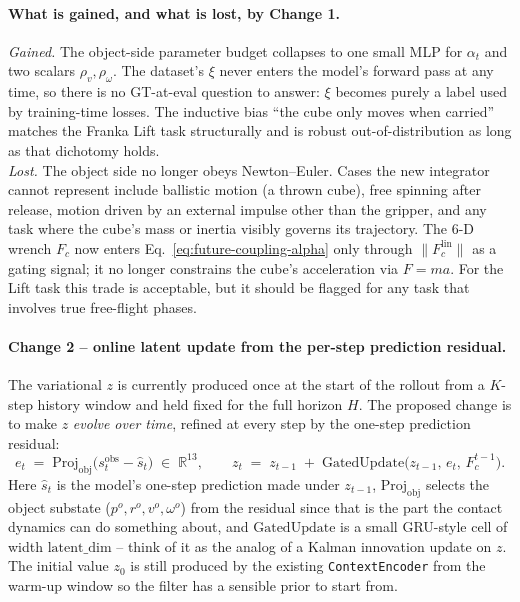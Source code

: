 \documentclass[11pt]{article}
\begin{document}
\paragraph{What is gained, and what is lost, by Change 1.}
\emph{Gained.} The object-side parameter budget collapses to one small
MLP for $\alpha_t$ and two scalars $\rho_v,\rho_\omega$. The dataset's
$\xi$ never enters the model's forward pass at any time, so there is
no GT-at-eval question to answer: $\xi$ becomes purely a label used by
training-time losses. The inductive bias ``the cube only moves when
carried'' matches the Franka Lift task structurally and is robust
out-of-distribution as long as that dichotomy holds.\\
\emph{Lost.} The object side no longer obeys Newton--Euler. Cases the
new integrator cannot represent include ballistic motion (a thrown
cube), free spinning after release, motion driven by an external
impulse other than the gripper, and any task where the cube's mass or
inertia visibly governs its trajectory. The 6-D wrench $F_c$ now
enters Eq.~\eqref{eq:future-coupling-alpha} only through
$\|F_c^{\mathrm{lin}}\|$ as a gating signal; it no longer constrains
the cube's acceleration via $F = m a$. For the Lift task this trade is
acceptable, but it should be flagged for any task that involves true
free-flight phases.

\paragraph{Change 2 -- online latent update from the per-step
prediction residual.}
The variational $z$ is currently produced once at the start of the
rollout from a $K$-step history window and held fixed for the full
horizon $H$. The proposed change is to make $z$ \emph{evolve over
time}, refined at every step by the one-step prediction residual:
\begin{equation}
  e_t \;=\; \mathrm{Proj}_{\mathrm{obj}}\!\bigl(s_t^{\mathrm{obs}} - \hat s_t\bigr)
  \;\in\;\mathbb{R}^{13},
  \qquad
  z_t \;=\; z_{t-1} \;+\; \mathrm{GatedUpdate}\!\bigl(z_{t-1},\,e_t,\,F_c^{t-1}\bigr).
  \label{eq:future-latent-online-update}
\end{equation}
Here $\hat s_t$ is the model's one-step prediction made under
$z_{t-1}$, $\mathrm{Proj}_{\mathrm{obj}}$ selects the object substate
($p^o, r^o, v^o, \omega^o$) from the residual since that is the part
the contact dynamics can do something about, and
$\mathrm{GatedUpdate}$ is a small GRU-style cell of width
$\mathrm{latent\_dim}$ -- think of it as the analog of a Kalman
innovation update on $z$. The initial value $z_0$ is still produced by
the existing \texttt{ContextEncoder} from the warm-up window so the
filter has a sensible prior to start from.
\end{document}
